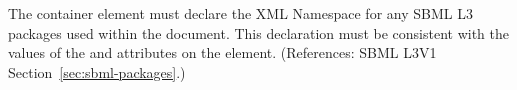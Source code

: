 The  container element must declare the XML Namespace
for any SBML L3 packages used within the document.  This 
declaration must be consistent with the values
of the  and  attributes on the 
 element.  (References: 
SBML L3V1 Section~\ref{sec:sbml-packages}.)
